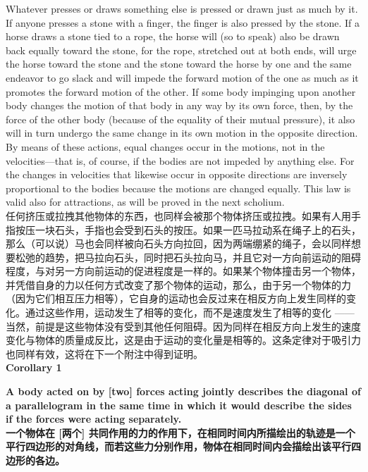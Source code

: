 \documentclass{article}
\begin{document}
\noindent Whatever presses or draws something else is pressed or drawn just as much by it. If anyone presses a stone with a finger, the finger is also pressed by the stone. If a horse draws a stone tied to a rope, the horse will (so to speak) also be drawn back equally toward the stone, for the rope, stretched out at both ends, will urge the horse toward the stone and the stone toward the horse by one and the same endeavor to go slack and will impede the forward motion of the one as much as it promotes the forward motion of the other. If some body impinging upon another body changes the motion of that body in any way by its own force, then, by the force of the other body (because of the equality of their mutual pressure), it also will in turn undergo the same change in its own motion in the opposite direction. By means of these actions, equal changes occur in the motions, not in the velocities—that is, of course, if the bodies are not impeded by anything else. For the changes in velocities that likewise occur in opposite directions are inversely proportional to the bodies because the motions are changed equally. This law is valid also for attractions, as will be proved in the next scholium.\\
任何挤压或拉拽其他物体的东西，也同样会被那个物体挤压或拉拽。如果有人用手指按压一块石头，手指也会受到石头的按压。如果一匹马拉动系在绳子上的石头，那么（可以说）马也会同样被向石头方向拉回，因为两端绷紧的绳子，会以同样想要松弛的趋势，把马拉向石头，同时把石头拉向马，并且它对一方向前运动的阻碍程度，与对另一方向前运动的促进程度是一样的。如果某个物体撞击另一个物体，并凭借自身的力以任何方式改变了那个物体的运动，那么，由于另一个物体的力（因为它们相互压力相等），它自身的运动也会反过来在相反方向上发生同样的变化。通过这些作用，运动发生了相等的变化，而不是速度发生了相等的变化 —— 当然，前提是这些物体没有受到其他任何阻碍。因为同样在相反方向上发生的速度变化与物体的质量成反比，这是由于运动的变化量是相等的。这条定律对于吸引力也同样有效，这将在下一个附注中得到证明。\\

\noindent\textbf{Corollary 1}

\addtolength{\leftskip}{1cm}
\addtolength{\rightskip}{1cm}

\noindent \textbf{A body acted on by [two] forces acting jointly describes the diagonal of a parallelogram in the same time in which it would describe the sides if the forces were acting separately.}\\
\noindent \textbf{一个物体在 [两个] 共同作用的力的作用下，在相同时间内所描绘出的轨迹是一个平行四边形的对角线，而若这些力分别作用，物体在相同时间内会描绘出该平行四边形的各边。}\\
\end{document}
